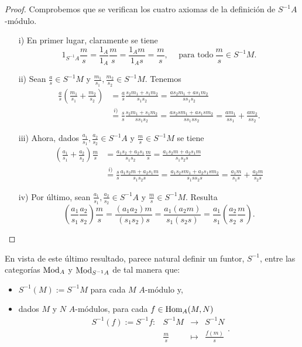 \documentclass[../main.tex]{subfiles}
\begin{document}
	\begin{proof}
		Comprobemos que se verifican los cuatro axiomas de la definición de $S^{-1}A$-módulo.
		\begin{itemize}
			\item[i)] En primer lugar, claramente se tiene $$1_{S^{-1}A}\frac{m}{s}=\frac{1_A}{1_A}\frac{m}{s}=\frac{1_Am}{1_As}=\frac{m}{s},\hspace{15pt}\text{para todo}\ \frac{m}{s}\in S^{-1}M.$$
			\item[ii)] Sean $\frac{a}{s}\in S^{-1}M$ y $\frac{m_1}{s_1},\frac{m_2}{s_2}\in S^{-1}M$. Tenemos
			\begin{align*}
			\frac{a}{s}\left(\frac{m_1}{s_1}+\frac{m_2}{s_2}\right)&=\frac{a}{s}\frac{s_2m_1+s_1m_2}{s_1s_2}=\frac{as_2m_1+as_1m_2}{ss_1s_2}\\
			&\overset{i)}{=}\frac{s}{s}\frac{s_2m_1+s_1m_2}{ss_1s_2}=\frac{as_2sm_1+as_1sm_2}{ss_1ss_2}=\frac{am_1}{ss_1}+\frac{am_2}{ss_2}.
			\end{align*}
			\item[iii)] Ahora, dados $\frac{a_1}{s_1},\frac{a_2}{s_2}\in S^{-1}A$ y $\frac{m}{s}\in S^{-1}M$ se tiene
			\begin{align*}
			\left(\frac{a_1}{s_1}+\frac{a_2}{s_2}\right)\frac{m}{s}&=\frac{a_1s_2+a_2s_1}{s_1s_2}\frac{m}{s}=\frac{a_1s_2m+a_2s_1m}{s_1s_2s}\\
			&\overset{i)}{=}\frac{s}{s}\frac{a_1s_2m+a_2s_1m}{s_1s_2s}=\frac{a_1s_2sm_1+a_2s_1sm_2}{s_1ss_2s}=\frac{a_1m}{s_1s}+\frac{a_2m}{s_2s}
			\end{align*}
			\item[iv)] Por último, sean $\frac{a_1}{s_1},\frac{a_2}{s_2}\in S^{-1}A$ y $\frac{m}{s}\in S^{-1}M$. Resulta
			$$\left(\frac{a_1}{s_1}\frac{a_2}{s_2}\right)\frac{m}{s}=\frac{(a_1a_2)m}{(s_1s_2)s}=\frac{a_1(a_2m)}{s_1(s_2s)}=\frac{a_1}{s_1}\left(\frac{a_2}{s_2}\frac{m}{s}\right).$$
		\end{itemize}
	\end{proof}

	En vista de este último resultado, parece natural definir un funtor, $S^{-1}$, entre las categorías $\text{Mod}_A$ y $\text{Mod}_{S^{-1}A}$ de tal manera que:
	\begin{itemize}
		\item $S^{-1}(M):=S^{-1}M$ para cada $M$ $A$-módulo y,
		\item dados $M$ y $N$ $A$-módulos, para cada $f\in\text{Hom}_A(M,N)$
		$$\begin{array}{rrcl}
		S^{-1}(f):=S^{-1}f:&S^{-1}M&\longrightarrow&S^{-1}N \\
		&\frac{m}{s}&\longmapsto&\frac{f(m)}{s}
		\end{array}.$$
	\end{itemize}
\end{document}
